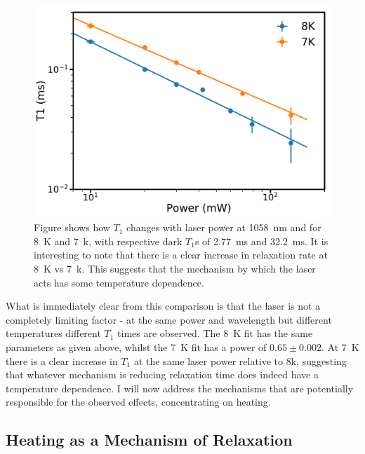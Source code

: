 \begin{figure}
\centering
\includegraphics[width=0.8\columnwidth]{Figures/T17Kvs8k_1058nmTest.pdf}
\caption[$T_1$ temperature comparison]{Figure shows how $T_1$ changes with laser power at 1058~nm and for 8~K and 7~k, with respective dark $T_1$s of 2.77~ms and 32.2~ms. It is interesting to note that there is a clear increase in relaxation rate at 8~K vs 7~k. This suggests that the mechanism by which the laser acts has some temperature dependence.}
\label{fig:t1tempcomp}
\end{figure}

What is immediately clear from this comparison is that the laser is not a completely limiting factor - at the same power and wavelength but different temperatures different $T_1$ times are observed.
The 8~K fit has the same parameters as given above, whilst the 7~K fit has a power of $0.65\pm 0.002$.
At 7~K there is a clear increase in $T_1$ at the same laser power relative to 8k, suggesting that whatever mechanism is reducing relaxation time does indeed have a temperature dependence.
I will now address the mechanisms that are potentially responsible for the observed effects, concentrating on heating.

\subsection{Heating as a Mechanism of Relaxation}

